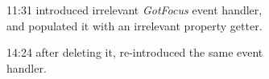 \begin{figure}
	\centering
	\begin{subfigure}{.45\textwidth}
		\caption{11:31 introduced irrelevant \emph{GotFocus} event handler, and populated it with an irrelevant property getter.}
	\end{subfigure}\hfill
	\begin{subfigure}{.4\textwidth}
		\caption{14:24 after deleting it, re-introduced the same event handler.} 
	\end{subfigure}
	\begin{subfigure}{.45\textwidth}

\end{subfigure}
\end{figure}
